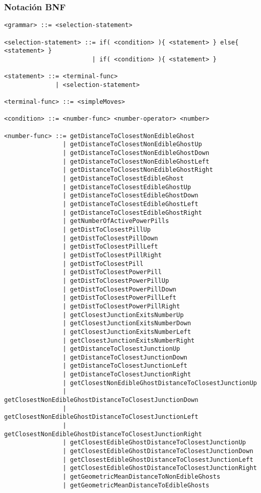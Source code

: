 \subsubsection{Notación BNF}
\begin{lstlisting}[frame=single, breaklines=no, basicstyle=\fontsize{10}{11}\ttfamily, caption=Gramática de bajo nivel]
<grammar> ::= <selection-statement>
 
<selection-statement> ::= if( <condition> ){ <statement> } else{ <statement> }
                        | if( <condition> ){ <statement> }
 
<statement> ::= <terminal-func>
              | <selection-statement>
 
<terminal-func> ::= <simpleMoves>
 
<condition> ::= <number-func> <number-operator> <number>
 
<number-func> ::= getDistanceToClosestNonEdibleGhost
                | getDistanceToClosestNonEdibleGhostUp
                | getDistanceToClosestNonEdibleGhostDown
                | getDistanceToClosestNonEdibleGhostLeft
                | getDistanceToClosestNonEdibleGhostRight
                | getDistanceToClosestEdibleGhost
                | getDistanceToClosestEdibleGhostUp
                | getDistanceToClosestEdibleGhostDown
                | getDistanceToClosestEdibleGhostLeft
                | getDistanceToClosestEdibleGhostRight
                | getNumberOfActivePowerPills
                | getDistToClosestPillUp
                | getDistToClosestPillDown
                | getDistToClosestPillLeft
                | getDistToClosestPillRight
                | getDistToClosestPill
                | getDistToClosestPowerPill
                | getDistToClosestPowerPillUp
                | getDistToClosestPowerPillDown
                | getDistToClosestPowerPillLeft
                | getDistToClosestPowerPillRight
                | getClosestJunctionExitsNumberUp
                | getClosestJunctionExitsNumberDown
                | getClosestJunctionExitsNumberLeft
                | getClosestJunctionExitsNumberRight
                | getDistanceToClosestJunctionUp
                | getDistanceToClosestJunctionDown
                | getDistanceToClosestJunctionLeft
                | getDistanceToClosestJunctionRight
                | getClosestNonEdibleGhostDistanceToClosestJunctionUp
                | getClosestNonEdibleGhostDistanceToClosestJunctionDown
                | getClosestNonEdibleGhostDistanceToClosestJunctionLeft
                | getClosestNonEdibleGhostDistanceToClosestJunctionRight
                | getClosestEdibleGhostDistanceToClosestJunctionUp
                | getClosestEdibleGhostDistanceToClosestJunctionDown
                | getClosestEdibleGhostDistanceToClosestJunctionLeft
                | getClosestEdibleGhostDistanceToClosestJunctionRight
                | getGeometricMeanDistanceToNonEdibleGhosts
                | getGeometricMeanDistanceToEdibleGhosts
 

\end{lstlisting}
